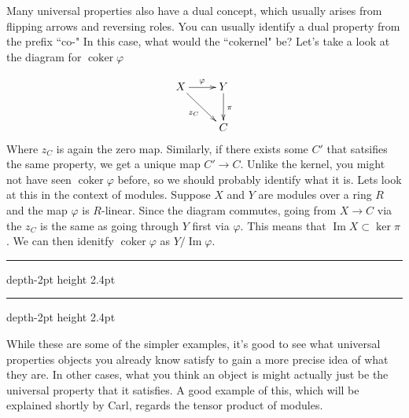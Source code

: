 \documentclass[psamsfonts]{amsart}
\theoremstyle{definition}
\theoremstyle{remark}
\DeclareMathOperator{\im}{Im}
\DeclareMathOperator{\coker}{coker}
\newcommand*\myhrulefill{%
   \leavevmode\leaders\hrule depth-2pt height 2.4pt\hfill\kern0pt}
\newcommand\niceending[1]{%
  \begin{center}%
    \LARGE \myhrulefill \hspace{0.2cm} #1 \hspace{0.2cm} \myhrulefill%
  \end{center}}
\newcommand*\subsectionend{\niceending{\decosix}}
\begin{document}
Many universal properties also have a dual concept, which usually arises from flipping arrows and reversing roles. You can usually identify a dual property from the prefix ``co-" In this case, what would the ``cokernel" be? Let's take a look at the diagram for $\coker \varphi$

\begin{align*}
\xymatrix{
X \ar[dr]_{z_C} \ar[r]^\varphi & Y \ar[d]^\pi \\
& C
}
\end{align*}
Where $z_C$ is again the zero map. Similarly, if there exists some $C'$ that satsifies the same property, we get a unique map $C' \to C$. Unlike the kernel, you might not have seen $\coker \varphi$ before, so we should probably identify what it is. Lets look at this in the context of modules. Suppose $X$ and $Y$ are modules over a ring $R$ and the map $\varphi$ is $R$-linear. Since the diagram commutes, going from $X \to C$ via the $z_C$ is the same as going through $Y$ first via $\varphi$. This means that $\im X \subset \ker \pi$. We can then idenitfy $\coker \varphi$ as $Y/\im \varphi$. 
\subsectionend

While these are some of the simpler examples, it's good to see what universal properties objects you already know satisfy to gain a more precise idea of what they are. In other cases, what you think an object is might actually just be the universal property that it satisfies. A good example of this, which will be explained shortly by Carl, regards the tensor product of modules.



 
\end{document}
